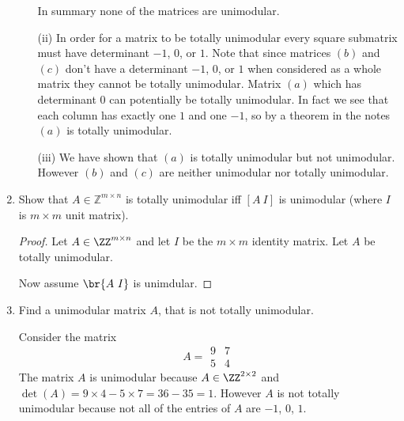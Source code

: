 \documentclass[11pt, oneside]{article}
\begin{document}
\begin{enumerate}
\begin{enumerate}
        In summary none of the matrices are unimodular.

      \item[(ii)]
        In order for a matrix to be totally unimodular every square submatrix
        must have determinant $-1$, $0$, or $1$.
        Note that since matrices $(b)$ and $(c)$ don't have a determinant
        $-1$, $0$, or $1$ when considered as a whole matrix they cannot be
        totally unimodular.
        Matrix $(a)$ which has determinant 0 can potentially be totally
        unimodular.
        In fact we see that each column has exactly one $1$ and one $-1$, so
        by a theorem in the notes $(a)$ is totally unimodular.

      \item[(iii)]
        We have shown that $(a)$ is totally unimodular but not unimodular.
        However $(b)$ and $(c)$ are neither unimodular nor totally unimodular.
    \end{enumerate}

  \item %
    Show that $A \in \mathbb{Z}^{m \times n}$ is totally unimodular iff $[A\ I]$
    is unimodular (where $I$ is $m \times m$ unit matrix).

    \begin{proof}
      Let $A \in \ZZ^{m \times n}$ and let $I$ be the $m \times m$ identity
      matrix.
      Let $A$ be totally unimodular.

      Now assume $\br{A\ I}$ is unimdular.
    \end{proof}

  \item %
    Find a unimodular matrix $A$, that is not totally unimodular.

    Consider the matrix
    \[
      A =
      \begin{matrix}
        9 & 7 \\
        5 & 4
      \end{matrix}
    \]
    The matrix $A$ is unimodular because
    $A \in \ZZ^{2 \times 2}$ and
    $\det(A) = 9 \times 4 - 5 \times 7 = 36 - 35 = 1$.
    However $A$ is not totally unimodular because not all of the
    entries of $A$ are $-1$, $0$, $1$.
\end{enumerate}
\end{document}
